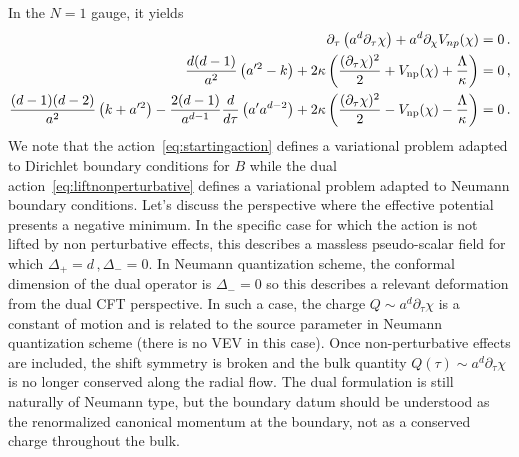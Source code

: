 \documentclass[a4paper]{article}
\begin{document}
In the $N=1$ gauge, it yields
\begin{equation}\label{eq:Nequal1gauge}
  \begin{aligned}
    \partial_\tau\left(a^d\partial_\tau \chi\right)+a^{d}\partial_{\chi}V_{np}(\chi)&=0\,.\\
    \frac{d(d-1)}{a^2}\left(a'^2-k\right)+2\kappa\left(\frac{(\partial_\tau \chi)^2}{2}+V_{\rm np}(\chi)+\frac{\Lambda}{\kappa}\right)&=0\,,\\
    \frac{(d-1)(d-2)}{a^2}\left(k+a'^2\right)-\frac{2(d-1)}{a^{d-1}}\frac{d}{d\tau}\left(a'a^{d-2}\right)+2\kappa \left(\frac{(\partial_\tau \chi)^2}{2}-V_{\rm np}(\chi)-\frac{\Lambda}{\kappa}\right)&=0\,.
  \end{aligned}
\end{equation}
We note that the action~\eqref{eq:startingaction} defines a variational problem adapted to Dirichlet boundary conditions for $B$ while the dual action~\eqref{eq:liftnonperturbative} defines a variational problem adapted to Neumann boundary conditions. Let's discuss the perspective where the effective potential presents a negative minimum. In the specific case for which the action is not lifted by non perturbative effects, this describes a massless pseudo-scalar field for which $\Delta_+=d\,,\Delta_- = 0$. In Neumann quantization scheme, the conformal dimension of the dual operator is $\Delta_-=0$ so this describes a relevant deformation from the dual CFT perspective. In such a case, the charge $Q\sim a^d \partial_\tau \chi$ is a constant of motion and is related to the source parameter in Neumann quantization scheme (there is no VEV in this case). Once non-perturbative effects are included, the shift symmetry is broken and the bulk quantity
\(Q(\tau)\sim a^d \partial_\tau\chi\) is no longer conserved along the radial flow. The dual
formulation is still naturally of Neumann type, but the boundary datum should be understood as
the renormalized canonical momentum at the boundary, not as a conserved charge throughout
the bulk.
\end{document}

